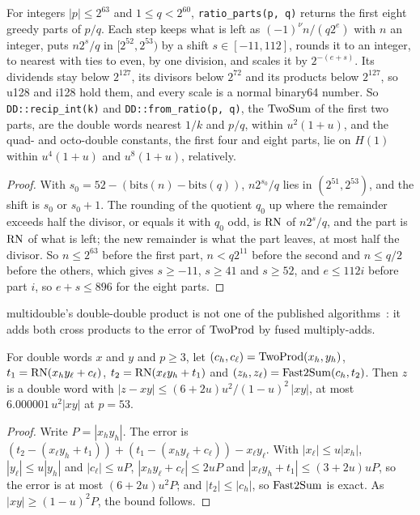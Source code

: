 \begin{proposition}\label{prop:ratio}
For integers $|p| \le 2^{63}$ and $1 \le q < 2^{60}$, \texttt{ratio\_parts(p, q)} returns the first eight greedy parts
of $p/q$. Each step keeps what is left as $(-1)^\nu n/(q2^e)$ with $n$ an integer, puts $n2^s/q$ in $[2^{52}, 2^{53})$
by a shift $s \in [-11, 112]$, rounds it to an integer, to nearest with ties to even, by one division, and scales it by
$2^{-(e + s)}$. Its dividends stay below $2^{127}$, its divisors below $2^{72}$ and its products below $2^{127}$, so
u128 and i128 hold them, and every scale is a normal binary64 number. So \texttt{DD::recip\_int(k)} and
\texttt{DD::from\_ratio(p, q)}, the $\mathrm{TwoSum}$ of the first two parts, are the double words nearest $1/k$ and $p/q$,
within $u^2(1 + u)$, and the quad- and octo-double constants, the first four and eight parts, lie on $H(1)$ within
$u^4(1 + u)$ and $u^8(1 + u)$, relatively.
\end{proposition}

\begin{proof}
With $s_0 = 52 - (\mathrm{bits}(n) - \mathrm{bits}(q))$, $n2^{s_0}/q$ lies in $(2^{51}, 2^{53})$, and the shift
is $s_0$ or $s_0 + 1$. The rounding of the quotient $q_0$ up where the remainder exceeds half the divisor, or equals
it with $q_0$ odd, is $\mathrm{RN}$ of $n2^s/q$, and the part is $\mathrm{RN}$ of what is left; the new remainder is what the part
leaves, at most half the divisor. So $n \le 2^{63}$ before the first part, $n < q2^{11}$ before the second and $n \le
q/2$ before the others, which gives $s \ge -11$, $s \ge 41$ and $s \ge 52$, and $e \le 112i$ before part $i$, so $e +
s \le 896$ for the eight parts.
\end{proof}

multidouble's double-double product is not one of the published algorithms~\cite{JMP17}: it adds both cross
products to the error of $\mathrm{TwoProd}$ by fused multiply-adds.

\begin{proposition}\label{prop:ddmul}
For double words $x$ and $y$ and $p \ge 3$, let $(c_h, c_\ell) = \mathrm{TwoProd}(x_h, y_h)$, $t_1 = \mathrm{RN}(x_hy_\ell + c_\ell)$,
$t_2 = \mathrm{RN}(x_\ell y_h + t_1)$ and $(z_h, z_\ell) = \mathrm{Fast2Sum}(c_h, t_2)$. Then $z$ is a double word with $|z - xy|
\le (6 + 2u)u^2/(1 - u)^2\,|xy|$, at most $6.000001\,u^2|xy|$ at $p = 53$.
\end{proposition}

\begin{proof}
Write $P = |x_hy_h|$. The error is $(t_2 - (x_\ell y_h + t_1)) + (t_1 - (x_hy_\ell + c_\ell)) - x_\ell y_\ell$. With
$|x_\ell| \le u|x_h|$, $|y_\ell| \le u|y_h|$ and $|c_\ell| \le uP$, $|x_hy_\ell + c_\ell| \le 2uP$ and $|x_\ell y_h +
t_1| \le (3 + 2u)uP$, so the error is at most $(6 + 2u)u^2P$; and $|t_2| \le |c_h|$, so $\mathrm{Fast2Sum}$ is exact. As
$|xy| \ge (1 - u)^2P$, the bound follows.
\end{proof}

